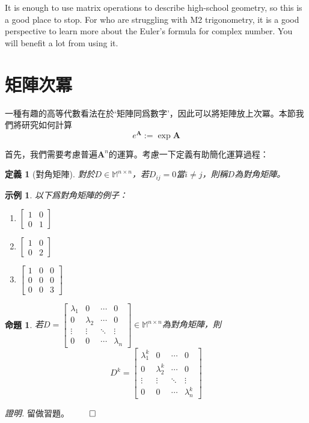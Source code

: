 \documentclass[12pt]{article}
\newtheorem{definition}{定義}
\newtheorem*{proposition}{命題}
\newtheorem*{example}{示例}
\renewenvironment*{proof}{\textit{證明.}}{\hfill$\qed$}
\begin{document}
    It is enough to use matrix operations to describe high-school geometry, so this is a good place to stop. For who are struggling with M2 trigonometry, it is a good perspective to learn more about the Euler's formula for complex number. You will benefit a lot from using it.
    \newpage
    \section*{矩陣次冪}

    一種有趣的高等代數看法在於‘矩陣同爲數字’，因此可以將矩陣放上次冪。本節我們將研究如何計算$$e^{\mathbf{A}}:=\exp{\mathbf{A}}$$

    首先，我們需要考慮普遍$\mathbf{A}^n$的運算。考慮一下定義有助簡化運算過程：
    \begin{definition}[對角矩陣]
        對於$D\in\mathbb{M}^{n\times n}$，若$D_{ij}=0$當$i\neq j$，則稱$D$為對角矩陣。
    \end{definition}
    \begin{example}
        以下爲對角矩陣的例子：\begin{enumerate}
            \item $\begin{bmatrix}
                1&0\\0&1
            \end{bmatrix}$
            \item $\begin{bmatrix}
                1&0\\0&2
            \end{bmatrix}$
            \item $\begin{bmatrix}
                1&0&0\\0&0&0\\0&0&3
            \end{bmatrix}$
        \end{enumerate}
    \end{example}

    \begin{proposition}
        若$D=\begin{bmatrix}
            \lambda_1&0&\cdots&0\\
            0&\lambda_2&\cdots&0\\
            \vdots&\vdots&\ddots&\vdots\\
            0&0&\cdots&\lambda_n
        \end{bmatrix}\in\mathbb{M}^{n\times n}$為對角矩陣，則$$D^k=\begin{bmatrix}
            \lambda_1^k&0&\cdots&0\\
            0&\lambda_2^k&\cdots&0\\
            \vdots&\vdots&\ddots&\vdots\\
            0&0&\cdots&\lambda_n^k
        \end{bmatrix}$$
    \end{proposition}
    \begin{proof}
        留做習題。
    \end{proof}
\end{document}

